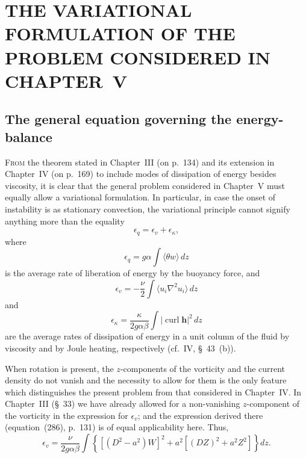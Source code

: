 \chapter{THE VARIATIONAL FORMULATION OF THE PROBLEM CONSIDERED IN CHAPTER~V}
\label{app:II}

\section{The general equation governing the energy-balance}\label{sec:127}

\textsc{From} the theorem stated in Chapter~III (on p.~134) and its extension in Chapter~IV (on p.~169) to include modes of dissipation of energy besides viscosity, it is clear that the general problem considered in Chapter~V must equally allow a variational formulation. In particular, in case the onset of instability is as stationary convection, the variational principle cannot signify anything more than the equality
\begin{equation}
\label{eq:A2-1}
\epsilon_q = \epsilon_v + \epsilon_\kappa,
\end{equation}
where
\begin{equation}
\label{eq:A2-2}
\epsilon_q = g\alpha \int \langle \theta w \rangle \, dz
\end{equation}
is the average rate of liberation of energy by the buoyancy force, and
\begin{equation}
\label{eq:A2-3}
\epsilon_v = -\frac{\nu}{2} \int \langle u_i \nabla^2 u_i \rangle \, dz
\end{equation}
and
\begin{equation}
\label{eq:A2-4}
\epsilon_\kappa = \frac{\kappa}{2g\alpha \beta} \int |\operatorname{curl} \mathbf{h}|^2 \, dz
\end{equation}
are the average rates of dissipation of energy in a unit column of the fluid by viscosity and by Joule heating, respectively (cf.\ IV, \S~43~(b)).

When rotation is present, the $z$-components of the vorticity and the current density do not vanish and the necessity to allow for them is the only feature which distinguishes the present problem from that considered in Chapter~IV. In Chapter~III (\S~33) we have already allowed for a non-vanishing $z$-component of the vorticity in the expression for $\epsilon_v$; and the expression derived there (equation~(286), p.~131) is of equal applicability here. Thus,
\begin{equation}
\label{eq:A2-5}
\epsilon_v = \frac{\nu}{2g\alpha \beta} \int \left\{ \left[(D^2 - a^2)W\right]^2 + a^2 \left[(DZ)^2 + a^2 Z^2\right] \right\} dz.
\end{equation}

